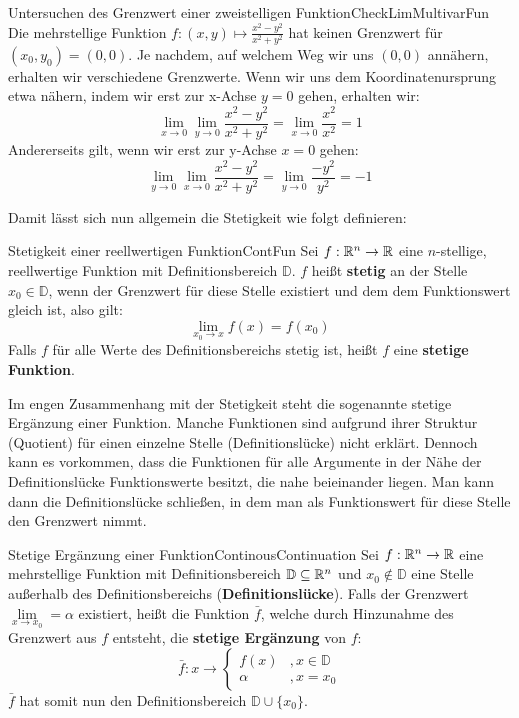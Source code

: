 \begin{example}{Untersuchen des Grenzwert einer zweistelligen Funktion}{CheckLimMultivarFun}
    Die mehrstellige Funktion $f: (x,y) \mapsto \frac{x^2-y^2}{x^2+y^2}$ hat keinen Grenzwert für $(x_0,y_0)=(0,0)$. Je nachdem, auf welchem Weg wir uns $(0,0)$ annähern, erhalten wir verschiedene Grenzwerte. Wenn wir uns dem Koordinatenursprung etwa nähern, indem wir erst zur x-Achse $y=0$ gehen, erhalten wir:
    $$
    \lim\limits_{x\to 0} \lim\limits_{y\to 0} \frac{x^2-y^2}{x^2+y^2} = \lim\limits_{x\to 0} \frac{x^2}{x^2} = 1
    $$
    Andererseits gilt, wenn wir erst zur y-Achse $x=0$ gehen:
    $$
    \lim\limits_{y\to 0} \lim\limits_{x\to 0} \frac{x^2-y^2}{x^2+y^2} = \lim\limits_{y\to 0} \frac{-y^2}{y^2} = -1
    $$
\end{example}

Damit lässt sich nun allgemein die Stetigkeit wie folgt definieren:

\begin{definition}{Stetigkeit einer reellwertigen Funktion}{ContFun}
    Sei $f: \mathbb{R}^n \to \mathbb{R}$ eine $n$-stellige, reellwertige Funktion mit Definitionsbereich $\mathbb{D}$. $f$ heißt \textbf{stetig} an der Stelle $x_0\in\mathbb{D}$, wenn der Grenzwert für diese Stelle existiert und dem dem Funktionswert gleich ist, also gilt:
    $$
        \lim\limits_{x_0\to x} f(x) = f(x_0)
    $$
    Falls $f$ für alle Werte des Definitionsbereichs stetig ist, heißt $f$ eine \textbf{stetige Funktion}.
\end{definition}

Im engen Zusammenhang mit der Stetigkeit steht die sogenannte stetige Ergänzung einer Funktion. Manche Funktionen sind aufgrund ihrer Struktur (Quotient) für einen einzelne Stelle (Definitionslücke) nicht erklärt. Dennoch kann es vorkommen, dass die Funktionen für alle Argumente in der Nähe der Definitionslücke Funktionswerte besitzt, die nahe beieinander liegen. Man kann dann die Definitionslücke schließen, in dem man als Funktionswert für diese Stelle den Grenzwert nimmt.

\begin{definition}{Stetige Ergänzung einer Funktion}{ContinousContinuation}
    Sei $f: \mathbb{R}^n\to\mathbb{R}$ eine mehrstellige Funktion mit Definitionsbereich $\mathbb{D}\subseteq\mathbb{R}^n$ und $x_0\notin\mathbb{D}$ eine Stelle außerhalb des Definitionsbereichs (\textbf{Definitionslücke}). Falls der Grenzwert $\lim\limits_{x\to x_0} = \alpha$ existiert, heißt die Funktion $\bar{f}$, welche durch Hinzunahme des Grenzwert aus $f$ entsteht, die \textbf{stetige Ergänzung} von $f$:
    $$
        \bar{f}: x \to \begin{cases}
            f(x) & , x \in \mathbb{D} \\
            \alpha & , x = x_0
        \end{cases}
    $$
    $\bar{f}$ hat somit nun den Definitionsbereich $\mathbb{D} \cup \lbrace x_0 \rbrace$.
\end{definition}

